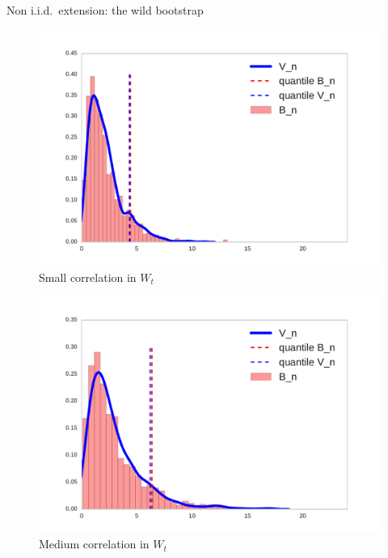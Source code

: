 \begin{frame}
\begin{columns}
\begin{column}{.33\linewidth}
\begin{block}{Non i.i.d.\ extension: the wild bootstrap}
\begin{center}
  \begin{minipage}{.49\linewidth}
\begin{figure}
 \includegraphics[width=\textwidth]{../../presentation/img/bootstrapWorks1.pdf}
 \caption{Small correlation in $W_t$} 
\end{figure}
 \end{minipage}
  \begin{minipage}{.49\linewidth}
\begin{figure}
 \includegraphics[width=\textwidth]{../../presentation/img/bootstrapWorks4.pdf}
 \caption{Medium correlation in $W_t$} 
\end{figure}
  \end{minipage}
\end{center}





\end{block}
\end{column}
\end{columns}
\end{frame}
